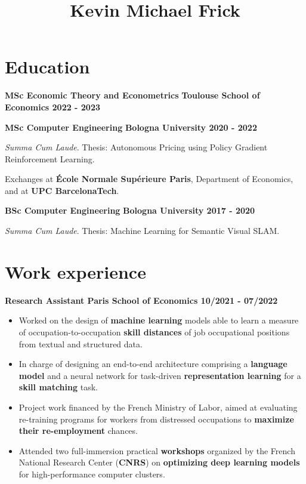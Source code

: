 \documentclass[11pt, a4paper]{article}
\title{Kevin Michael Frick}
\author{}
\begin{document}
\maketitle

\section*{Education}

\textbf{MSc Economic Theory and Econometrics} \hfill \textbf{Toulouse School of Economics \textbar{} 2022 - 2023}

\textbf{MSc Computer Engineering} \hfill  \textbf{ Bologna University
\textbar{} 2020 - 2022}

\textit{Summa Cum Laude}. Thesis: Autonomous Pricing using Policy Gradient Reinforcement Learning.

Exchanges at \textbf{École Normale Supérieure Paris}, Department of Economics, and at \textbf{UPC
BarcelonaTech}.

\textbf{BSc Computer Engineering} \hfill \textbf{Bologna University
\textbar{} 2017 - 2020}

\textit{Summa Cum Laude}. Thesis: Machine Learning for Semantic Visual SLAM.




\section*{Work experience}


\textbf{Research Assistant \hfill  \hspace{1pt} Paris School of Economics \textbar{} 10/2021 - 07/2022}

\begin{itemize}

\item
  Worked on the design of \textbf{machine learning} models able to
  learn a measure of occupation-to-occupation \textbf{skill distances}
  of job occupational positions from textual and structured data.
\item
  In charge of designing an end-to-end architecture comprising a
  \textbf{language model} and a neural network for task-driven
  \textbf{representation learning} for a \textbf{skill matching} task.
\item

  Project work financed by the French Ministry of Labor, 
  aimed at evaluating re-training programs for workers from distressed occupations to
  \textbf{maximize their re-employment} chances.
  \item
  
  Attended two full-immersion practical \textbf{workshops} organized by the French National Research Center (\textbf{CNRS}) on \textbf{optimizing deep learning models} for high-performance computer clusters.
\end{itemize}
\end{document}
